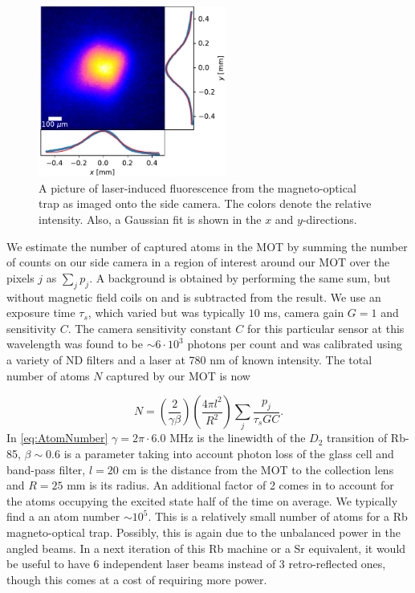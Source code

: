 \begin{figure}
    \centering
    \includegraphics[width=0.55\textwidth]{figures/FluoresenceAndFits.pdf}
    \caption{A picture of laser-induced fluorescence from the magneto-optical trap as imaged onto the side camera. 
    The colors denote the relative intensity.
    Also, a Gaussian fit is shown in the $x$ and $y$-directions.}
    \label{fig:LiF}
\end{figure}

We estimate the number of captured atoms in the MOT by summing the number of counts on our side camera in a region of interest around our MOT over the pixels $j$ as $\sum_j p_j$.
A background is obtained by performing the same sum, but without magnetic field coils on and is subtracted from the result. 
We use an exposure time $\tau_s$, which varied but was typically $10$ ms, camera gain $G = 1$ and sensitivity $C$.
The camera sensitivity constant $C$ for this particular sensor at this wavelength was found to be $\sim 6 \cdot 10^3$ photons per count and was calibrated using a variety of ND filters and a laser at 780 nm of known intensity. The total number of atoms $N$ captured by our MOT is now
 
 \begin{equation}\label{eq:AtomNumber}
     N = \left( \frac{2}{\gamma\beta}\right)
     \left(\frac{4\pi l^2}{R^2}\right)
     \sum_j \frac{p_j}{\tau_s G C}.
 \end{equation}
In \cref{eq:AtomNumber} $\gamma = 2\pi \cdot 6.0$ MHz is the linewidth of the $D_2$ transition of Rb-85, $\beta \sim 0.6$ is a parameter taking into account photon loss of the glass cell and band-pass filter, $l = 20$ cm is the distance from the MOT to the collection lens and $R = 25$ mm is its radius. 
An additional factor of 2 comes in to account for the atoms occupying the excited state half of the time on average. 
We typically find a an atom number $\sim 10^5$.
This is a relatively small number of atoms for a Rb magneto-optical trap.
Possibly, this is again due to the unbalanced power in the angled beams. In a next iteration of this Rb machine or a Sr equivalent, it would be useful to have 6 independent laser beams instead of 3 retro-reflected ones, though this comes at a cost of requiring more power. 

